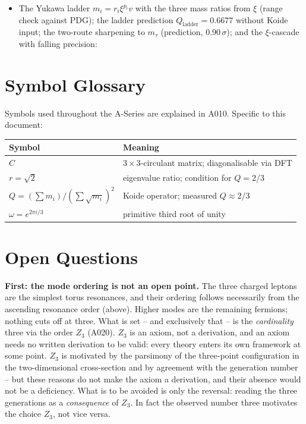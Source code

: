 \begin{itemize}
  \item The Yukawa ladder $m_i = r_i\xi^{p_i}v$ with the three mass ratios
    from $\xi$ (range check against PDG); the ladder prediction
    $Q_\text{ladder}=0{.}6677$ without Koide input; the two-route sharpening to
    $m_\tau$ (prediction, $0{.}90\,\sigma$); and the $\xi$-cascade with falling
    precision:
\end{itemize}

\section{Symbol Glossary}

Symbols used throughout the A-Series are explained in A010.
Specific to this document:

\begin{center}
\renewcommand{\arraystretch}{1.3}
{\small\begin{tabular}{lp{9cm}}
\toprule
Symbol & Meaning \\
\midrule
$C$ & $3\times3$-circulant matrix; diagonalisable via DFT \\
$r=\sqrt{2}$ & eigenvalue ratio; condition for $Q=2/3$ \\
$Q = (\sum m_i)/(\sum\sqrt{m_i})^2$ & Koide operator; measured $Q\approx2/3$ \\
$\omega = e^{2\pi i/3}$ & primitive third root of unity \\
\bottomrule
\end{tabular}}
\renewcommand{\arraystretch}{1.0}
\end{center}

\section{Open Questions}

\textbf{First: the mode ordering is not an open point.} The three charged
leptons are the simplest torus resonances, and their ordering follows
necessarily from the ascending resonance order (above). Higher modes are the
remaining fermions; nothing cuts off at three. What is set -- and exclusively
that -- is the \emph{cardinality} three via the order $Z_3$ (A020). $Z_3$ is an
axiom, not a derivation, and an axiom needs no written derivation to be valid:
every theory enters its own framework at some point. $Z_3$ is motivated by the
parsimony of the three-point configuration in the two-dimensional cross-section
and by agreement with the generation number -- but these reasons do not make the
axiom a derivation, and their absence would not be a deficiency. What is to be
avoided is only the reversal: reading the three generations as a \emph{consequence}
of $Z_3$. In fact the observed number three motivates the choice $Z_3$, not vice versa.

